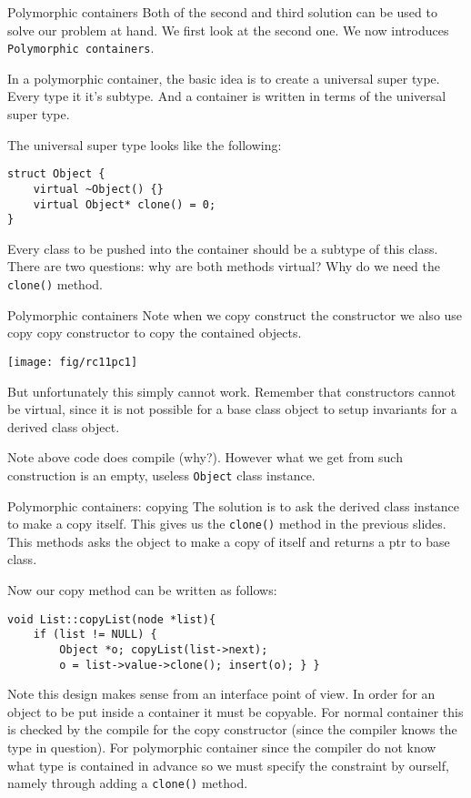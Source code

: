 \begin{frame}[fragile]{Polymorphic containers}
Both of the second and third solution can be used to solve our problem at hand. We first look at the second one.  We now introduces \texttt{Polymorphic containers}. 

In a polymorphic container, the basic idea is to create a universal super type. Every type it it's subtype. And a container is written in terms of the universal super type.

The universal super type looks like the following:

\begin{verbatim}
struct Object {
	virtual ~Object() {}
	virtual Object* clone() = 0;
}
\end{verbatim}
 
Every class to be pushed into the container should be a subtype of this class. There are two questions: why are both methods virtual? Why do we need the \texttt{clone()} method.
\end{frame}

\begin{frame}{Polymorphic containers}
Note when we copy construct the constructor we also use copy copy constructor to copy the contained objects. 

\texttt{[image: fig/rc11pc1]}

But unfortunately this simply cannot work. Remember that constructors cannot be virtual, since it is not possible for a base class object to setup invariants for a derived class object. 

Note above code does compile (why?). However what we get from such construction is an empty, useless \texttt{Object} class instance.
\end{frame}

\begin{frame}[fragile]{Polymorphic containers: copying}
\small
The solution is to ask the derived class instance to make a copy itself. This gives us the \texttt{clone()} method in the previous slides. This methods asks the object to make a copy of itself and returns a ptr to base class.  

Now our copy method can be written as follows:

\begin{verbatim}
void List::copyList(node *list){
    if (list != NULL) {
        Object *o; copyList(list->next);
        o = list->value->clone(); insert(o); } }
\end{verbatim}

Note this design makes sense from an interface point of view. In order for an object to be put inside a container it must be copyable. For normal container this is checked by the compile for the copy constructor (since the compiler knows the type in question). For polymorphic container since the compiler do not know what type is contained in advance so we must specify the constraint by ourself, namely through adding a \texttt{clone()} method.
\end{frame}

